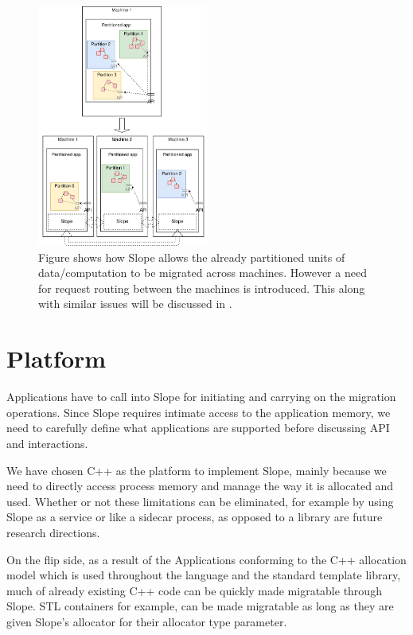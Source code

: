 \begin{figure}[H]
\centering

\includegraphics[width=0.5\textwidth]{design-goals-pluggable.drawio}
\caption{
    Figure shows how Slope allows the already partitioned units of
    data/computation to be migrated across machines. However a need for request
    routing between the machines is introduced. This along with similar issues
    will be discussed in .
}
\label{fig:designgoalspluggable}
\end{figure}

\section{Platform}
\label{sec:platform}

Applications have to call into Slope for initiating and carrying on the
migration operations. Since Slope requires intimate access to the application
memory, we need to carefully define what applications are supported
before discussing API and interactions.

We have chosen C++ as the platform to implement Slope, mainly because we need
to directly access process memory and manage the way it is allocated and used.
Whether or not these limitations can be eliminated, for example by using Slope
as a service or like a sidecar process, as opposed to a library are future
research directions.

On the flip side, as a result of the Applications conforming to the C++
allocation model which is used throughout the language and the standard
template library, much of already existing C++ code can be quickly made
migratable through Slope. STL containers for example, can be made migratable as long as they are given Slope's allocator for their allocator type parameter.

